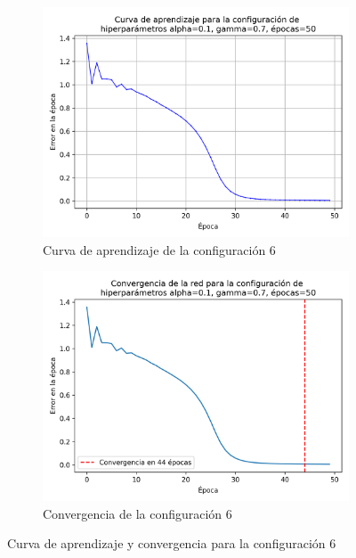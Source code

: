 \documentclass{article}
\begin{document}
\newpage
\begin{figure}[h!]
    \centering
    \begin{subfigure}{0.49\textwidth}
        \includegraphics[width=\linewidth]{imgs/XOR/configs/curva_aprendizaje_alpha_0.1_gamma_0.7_epochs_50.png}
        \caption{Curva de aprendizaje de la configuración 6}
        \label{fig:conf_6_xor_lr}
    \end{subfigure}
    \hfill
    \begin{subfigure}{0.49\textwidth}
       \includegraphics[width=\linewidth]{imgs/XOR/configs/convergencia_alpha_0.1_gamma_0.7_epochs_50.png}
        \caption{Convergencia de la configuración 6}
        \label{fig:conf6_xor_con}
    \end{subfigure}
    \caption{Curva de aprendizaje y convergencia para la configuración 6}
    \label{fig:conf6_lr_con_xor}
\end{figure}
\end{document}
